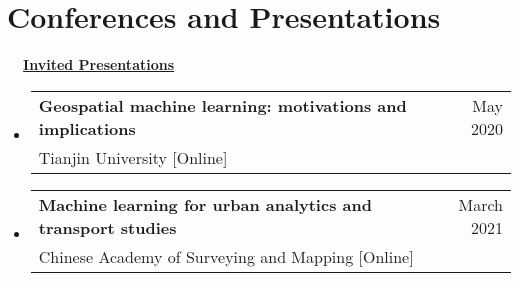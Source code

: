 \documentclass[A4,11pt]{article}
\makeatletter
\newcommand{\CVSubheading}[4]{
  \vspace{-2pt}\item
    \begin{tabular*}{0.97\textwidth}[t]{l@{\extracolsep{\fill}}r}
      \textbf{#1} & #2 \\
      \small#3 & \small #4 \\
    \end{tabular*}\vspace{-7pt}
}
\newcommand{\CVSubHeadingListStart}{\begin{itemize}[leftmargin=0.5cm, label={}]}
\newcommand{\CVSubHeadingListEnd}{\end{itemize}}
\makeatother
\begin{document}
\begin{comment}
Ideally the title of the work should speak for what it is. However if you feel
like you should explain more about why the project is applicable to this job,
use item list as is shown in the work experience section.
\end{comment}


\begin{comment}
Again the title should have already been enough, but if it is necessary to add
descriptions maintain the consistency from prior sections
\end{comment}

\section{Conferences and Presentations}
\noindent \textbf{\ \ \underline{Invited Presentations}}
  \CVSubHeadingListStart
    \CVSubheading
      {Geospatial machine learning: motivations and implications}{May 2020}
      {Tianjin University [Online]}{}
    \CVSubheading
      {Machine learning for urban analytics and transport studies}{March 2021}
      {Chinese Academy of Surveying and Mapping [Online]}{}
  \CVSubHeadingListEnd
\end{document}
